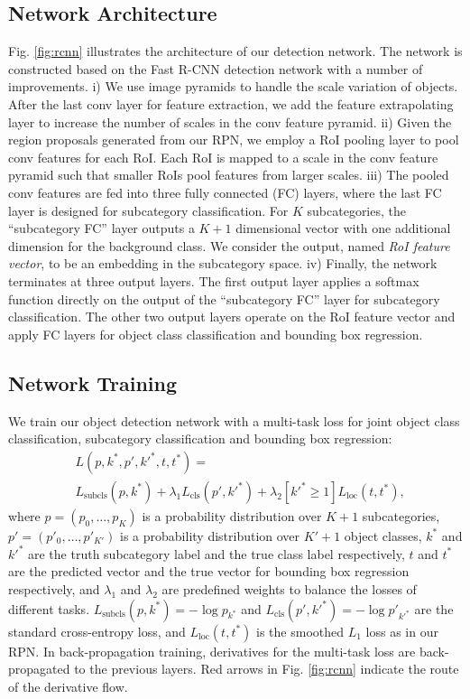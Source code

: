 \documentclass[10pt,twocolumn,letterpaper]{article}
\begin{document}
\subsection{Network Architecture}

Fig. \ref{fig:rcnn} illustrates the architecture of our detection network. The network is constructed based on the Fast R-CNN detection network \cite{girshick2015fast} with a number of improvements. i) We use image pyramids to handle the scale variation of objects. After the last conv layer for feature extraction, we add the feature extrapolating layer to increase the number of scales in the conv feature pyramid. ii) Given the region proposals generated from our RPN, we employ a RoI pooling layer to pool conv features for each RoI. Each RoI is mapped to a scale in the conv feature pyramid such that smaller RoIs pool features from larger scales. iii) The pooled conv features are fed into three fully connected (FC) layers, where the last FC layer is designed for subcategory classification. For $K$ subcategories, the ``subcategory FC'' layer outputs a $K+1$ dimensional vector with one additional dimension for the background class. We consider the output, named \emph{RoI feature vector}, to be an embedding in the subcategory space. iv) Finally, the network terminates at three output layers. The first output layer applies a softmax function directly on the output of the ``subcategory FC'' layer for subcategory classification. The other two output layers operate on the RoI feature vector and apply FC layers for object class classification and bounding box regression. 

\subsection{Network Training}

We train our object detection network with a multi-task loss for joint object class classification, subcategory classification and bounding box regression:
\begin{align}
	& L(p,k^*,p',k'^{*},t,t^*) = \\
	& L_{\text{subcls}}(p,k^*) + \lambda_1 L_{\text{cls}}(p',k'^*) + \lambda_2 [k'^{*} \geq 1] L_{\text{loc}}(t,t^*), \nonumber
\end{align}
where $p = (p_0, \ldots, p_K)$ is a probability distribution over $K+1$ subcategories, $p' = (p'_0, \ldots, p'_{K'})$ is a probability distribution over $K'+1$ object classes, $k^*$ and $k'^{*}$ are the truth subcategory label and the true class label respectively, $t$ and $t^{*}$ are the predicted vector and the true vector for bounding box regression respectively, and $\lambda_1$ and $\lambda_2$ are predefined weights to balance the losses of different tasks. $L_{\text{subcls}}(p,k^*) = -\log p_{k^*}$ and $L_{\text{cls}}(p',k'^*) = -\log p'_{k'^*}$ are the standard cross-entropy loss, and $L_{\text{loc}}(t,t^*)$ is the smoothed $L_1$ loss as in our RPN. In back-propagation training, derivatives for the multi-task loss are back-propagated to the previous layers. Red arrows in Fig. \ref{fig:rcnn} indicate the route of the derivative flow.
\end{document}
